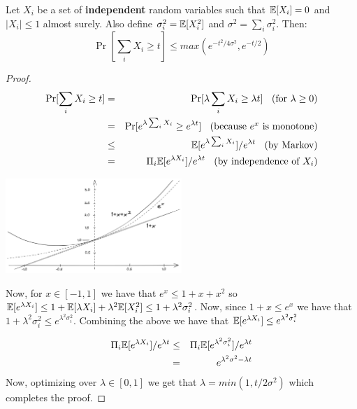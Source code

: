\documentclass{article}
\begin{document}
\begin{theorem}
Let $X_i$ be a set of {\bf independent} random variables such that ${\mathbb E}[X_i] = 0$ and $|X_i| \le 1$ almost surely.
Also define $\sigma_i^2 = {\mathbb E}[X_i^2]$ and $\sigma^2 = \sum_i \sigma_i^2$. Then:
\[
\Pr[ \sum_i X_i \ge t ] \le max(e^{-t^2/4\sigma^2} , e^{-t/2})
\]
\end{theorem}
\begin{proof}
\begin{eqnarray}
\Pr[ \sum_i X_i \ge t ] &=& \Pr[ \lambda \sum_i X_i \ge \lambda  t ]  \mbox{\;\; (for $\lambda \ge 0$)} \\
&= &\Pr[ e^{\lambda \sum_i X_i} \ge e^{\lambda  t} ]   \mbox{\;\; (because $e^x$ is monotone)} \\
&\le &{\mathbb E}[e^{\lambda \sum_i X_i}] /e^{\lambda  t} \mbox{\;\; (by Markov)} \\
&=& \Pi_i {\mathbb E}[e^{\lambda X_i}] /e^{\lambda  t} \mbox{\;\; (by independence of $X_i$)} 
\end{eqnarray}

\begin{center}
\includegraphics[width=0.5\textwidth]{images/chernoff-exp-bounds.png}
\end{center}

Now, for $x \in [-1,1]$ we have that $e^x \le 1 + x + x^2$ so ${\mathbb E}[e^{\lambda X_i}] \le 1 + {\mathbb E}[\lambda X_i] + \lambda^2 {\mathbb E}[X_i^2] \le 1 + \lambda^2 \sigma^2_i$.
Now, since $1+x \le e^x$ we have that $1 + \lambda^2 \sigma^2_i \le e^{\lambda^2 \sigma_i^2}$. Combining the above we have that ${\mathbb E}[e^{\lambda X_i}] \le e^{\lambda^2 \sigma_i^2}$




\begin{eqnarray}
\Pi_i {\mathbb E}[e^{\lambda X_i}] /e^{\lambda  t} &\le& \Pi_i {\mathbb E}[e^{\lambda^2 \sigma_i^2}] /e^{\lambda  t}\\
&= & e^{\lambda^2 \sigma^2 - \lambda t}
\end{eqnarray}
Now, optimizing over $\lambda \in [0,1]$ we get that $\lambda = min(1,t/2\sigma^2)$ which completes the proof.
\end{proof}
\end{document}
